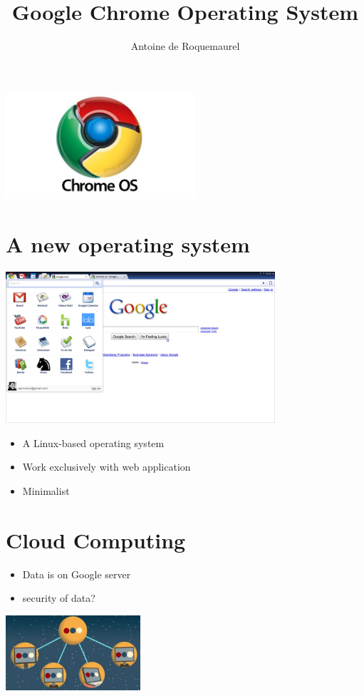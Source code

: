 \documentclass{beamer}
\title{Google Chrome Operating System}
\author{Antoine de Roquemaurel}\institute{}
\begin{document}
\begin{frame}
\titlepage
\begin{center}
\includegraphics[width=7cm]{logo.jpg}
\end{center}
\end{frame}

\section{A new operating system}
\begin{frame}
\includegraphics[width=10cm]{screen.png}
\begin{itemize}
	\item A Linux-based operating system
	\item Work exclusively with web application
	\item Minimalist
\end{itemize}
\end{frame}

\section{Cloud Computing}
\begin{frame}
\begin{itemize}
	\item Data is on Google server
	\item security of data?
\end{itemize}
\includegraphics[width=5cm]{cloud.jpg}
\end{frame}
\end{document}
